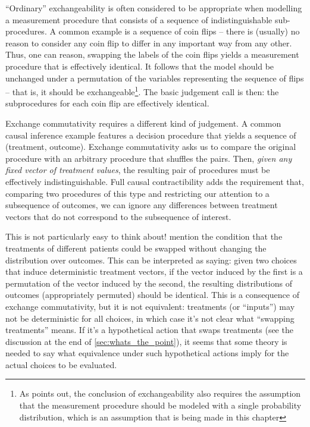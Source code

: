 ``Ordinary'' exchangeability is often considered to be appropriate when modelling a measurement procedure that consists of a sequence of indistinguishable sub-procedures. A common example is a sequence of coin flips -- there is (usually) no reason to consider any coin flip to differ in any important way from any other. Thus, one can reason, swapping the labels of the coin flips yields a measurement procedure that is effectively identical. It follows that the model should be unchanged under a permutation of the variables representing the sequence of flips -- that is, it should be exchangeable\footnote{As \citet[pg. 461]{walley_statistical_1991} points out, the conclusion of exchangeability also requires the assumption that the measurement procedure should be modeled with a single probability distribution, which is an assumption that is being made in this chapter}. The basic judgement call is then: the subprocedures for each coin flip are effectively identical.

Exchange commutativity requires a different kind of judgement. A common causal inference example features a decision procedure that yields a sequence of (treatment, outcome). Exchange commutativity asks us to compare the original procedure with an arbitrary procedure that shuffles the pairs. Then, \emph{given any fixed vector of treatment values}, the resulting pair of procedures must be effectively indistinguishable. Full causal contractibility adds the requirement that, comparing two procedures of this type and restricting our attention to a subsequence of outcomes, we can ignore any differences between treatment vectors that do not correspond to the subsequence of interest.

This is not particularly easy to think about! \citet{greenland_identifiability_1986} mention the condition that the treatments of different patients could be swapped without changing the distribution over outcomes. This can be interpreted as saying: given two choices that induce deterministic treatment vectors, if the vector induced by the first is a permutation of the vector induced by the second, the resulting distributions of outcomes (appropriately permuted) should be identical. This is a consequence of exchange commutativity, but it is not equivalent: treatments (or ``inputs'') may not be deterministic for all choices, in which case it's not clear what ``swapping treatments'' means. If it's a hypothetical action that swaps treatments (see the discussion at the end of \ref{sec:whats_the_point}), it seems that some theory is needed to say what equivalence under such hypothetical actions imply for the actual choices to be evaluated.

